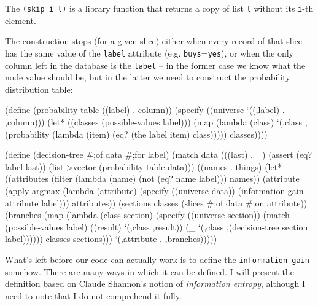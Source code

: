 The \texttt{(skip i l)} is a library function that returns a copy
of list \texttt{l} without its \texttt{i}-th element.

The construction stops (for a given slice) either when
every record of that slice has the same value of the \texttt{label}
attribute (e.g. \texttt{buys}=\texttt{yes}), or when the
only column left in the database is the \texttt{label} -- in
the former case we know what the node value should be, but in
the latter we need to construct the probability distribution
table:

\begin{Snippet}
(define (probability-table ((label) . column))
  (specify ((universe `((,label) . ,column)))
    (let* ((classes (possible-values label)))
      (map (lambda (class)
	     `(,class ,(probability (lambda (item)
				      (eq? (the label item)
					   class)))))
	   classes))))
\end{Snippet}
\begin{Snippet}
(define (decision-tree #;of data #;for label)
  (match data
    (((last) . _)
     (assert (eq? label last))
     (list->vector (probability-table data)))
    ((names . things)
     (let* ((attributes (filter (lambda (name)
                                  (not (eq? name label)))
                                names))
            (attribute (apply argmax
                              (lambda (attribute)
                                (specify ((universe data))
                                  (information-gain attribute label)))
                              attributes))
            (sections classes (slices #;of data #;on attribute))
            (branches (map (lambda (class section)
                             (specify ((universe section))
                               (match (possible-values label)
                                 ((result)
                                  `(,class ,result))
                                 (_
                                 `(,class ,(decision-tree section
                                                          label))))))
                           classes sections)))
       `(,attribute . ,branches)))))
\end{Snippet}

What's left before our code can actually work is to define
the \texttt{information\--gain} somehow. There are many ways
in which it can be defined. I will present the definition
based on Claude Shannon's notion of \textit{information entropy},
although I need to note that I do not comprehend it fully.

